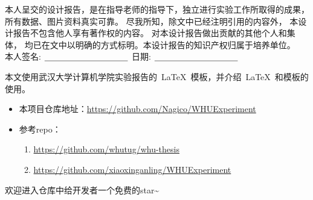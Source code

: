 


\newpage
\thispagestyle{empty}
\vspace*{20pt}
\begin{center}{}\end{center}
\par\vspace*{30pt}
\renewcommand{\baselinestretch}{2}

{%

本人呈交的设计报告，是在指导老师的指导下，独立进行实验工作所取得的成果，
所有数据、图片资料真实可靠。 尽我所知，除文中已经注明引用的内容外，
本设计报告不包含他人享有著作权的内容。
对本设计报告做出贡献的其他个人和集体，
均已在文中以明确的方式标明。本设计报告的知识产权归属于培养单位。\\[2cm]

\hspace*{1cm}本人签名: $\underline{\hspace{3.5cm}}$
\hspace{2cm}日期: $\underline{\hspace{3.5cm}}$\hfill\par}
\baselineskip=23pt  %





\begin{cnabstract}
\thispagestyle{empty}

本文使用武汉大学计算机学院实验报告的~\LaTeX~模板，并介绍~\LaTeX~和模板的使用。

\begin{itemize}
    \item 本项目仓库地址：\url{https://github.com/Nagico/WHUExperiment}
    \item 参考repo：
    \begin{enumerate}
        \item \url{https://github.com/whutug/whu-thesis}
        \item \url{https://github.com/xiaoxinganling/WHUExperiment}
    \end{enumerate}
\end{itemize}

欢迎进入仓库中给开发者一个免费的star\textasciitilde


\end{cnabstract}
\par
\vspace*{2em}





